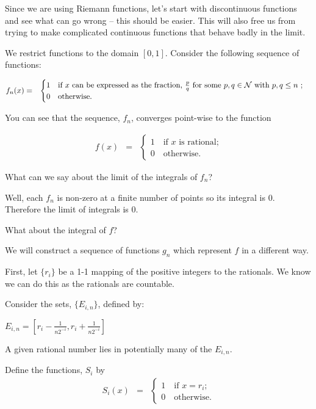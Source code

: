 \documentclass{article}
\begin{document}
Since we are using Riemann functions, 
let's start with discontinuous functions 
and see what can go wrong -- this should be easier. This will also free us from 
trying to make complicated continuous functions that behave badly in the limit.

We restrict functions to the domain $[0, 1]$.
Consider the following sequence of functions: 

\begin{eqnarray}
	f_n(x) & = & \begin{cases}  1 \quad \text{if $x$ can be expressed as the fraction, $\frac{p}{q}$ for some $p, q \in {\cal N}$ with $p, q \le n$ ;} \\ 
	  			        		0 \quad \text{otherwise.} 
			   	 \end{cases}
\end{eqnarray}

You can see that the sequence, $f_n$, converges point-wise to the function 

\begin{eqnarray}
	f(x) & = & \begin{cases} 1 \quad \text{if $x$ is rational;} \\ 
			                 0 \quad \text{otherwise.} 
			   \end{cases}
\end{eqnarray}

What can we say about the limit of the integrals of $f_n$?

Well, each $f_n$ is non-zero at a finite number of points so its integral is $0$.
Therefore the limit of integrals is $0$.

What about the integral of $f$?

We will construct a sequence of functions $g_n$ which represent $f$ in a different way.

First, let $\{r_i\}$ be a 1-1 mapping of the positive integers to the rationals.
We know we can do this as the rationals are countable. 

Consider the sets, $\{E_{i,n}\}$, defined by:

$E_{i,n} = \left[r_i - \frac{1}{n 2^{-i}}, r_i + \frac{1}{n2^{-i}}\right]$

A given rational number lies in potentially many of the $E_{i,n}$.

Define the functions, $S_i$ by
\begin{eqnarray}
	S_{i}(x) & = & \begin{cases} 1 \quad \text{if $x = r_i$}; \\ 
	 							  0 \quad \text{otherwise.} 
					\end{cases}
\end{eqnarray}
\end{document}
